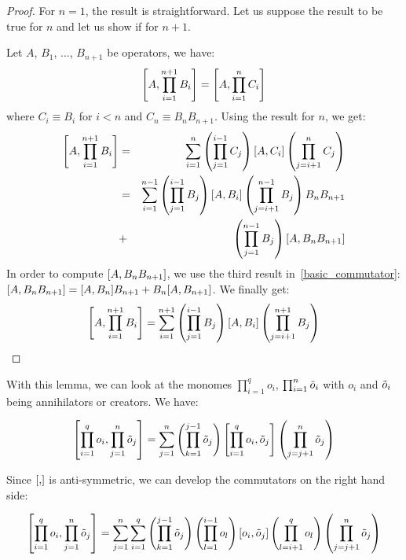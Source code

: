 \begin{proof}
    For $n = 1$, the result is straightforward. Let us suppose the result to be true for $n$ and let us show if for $n+1$.

    Let $A$, $B_1$, ..., $B_{n+1}$ be operators, we have:
    \begin{equation}
        \commutator{A}{\prod_{i = 1}^{n+1} B_i} = \commutator{A}{\prod_{i = 1}^{n} C_i}
    \end{equation}
    where $C_i \equiv B_i$ for $i < n$ and $C_n \equiv B_n B_{n+1}$.
    Using the result for $n$, we get:
    \begin{eqnarray}
        \commutator{A}{\prod_{i = 1}^{n+1} B_i} &=& \sum_{i = 1}^n \left(\prod_{j = 1}^{i-1} C_j \right) \commutator{A}{C_i} \left(\prod_{j = i+1}^{n} C_j \right) \nonumber\\
        &=& \sum_{i = 1}^{n-1} \left(\prod_{j = 1}^{i-1} B_j \right) \commutator{A}{B_i} \left(\prod_{j = i+1}^{n-1} B_j \right) B_n B_{n+1} \nonumber\\
        &+& \left(\prod_{j = 1}^{n-1} B_j \right) \commutator{A}{B_n B_{n+1}}
    \end{eqnarray}
    In order to compute $\commutator{A}{B_n B_{n+1}}$, we use the third result in~\autoref{basic_commutator}: $\commutator{A}{B_n B_{n+1}} = \commutator{A}{B_n} B_{n+1} + B_n \commutator{A}{B_{n+1}}$. We finally get:
    \begin{equation}
        \commutator{A}{\prod_{i = 1}^{n+1} B_i} = \sum_{i = 1}^{n+1} \left(\prod_{j = 1}^{i-1} B_j \right) \commutator{A}{B_i} \left(\prod_{j = i+1}^{n+1} B_j \right)
    \end{equation}
\end{proof}

With this lemma, we can look at the monomes $\prod_{i = 1}^q o_i$, $\prod_{i = 1}^n \Tilde{o}_i$ with $o_i$ and $\Tilde{o}_i$ being annihilators or creators. We have:

\begin{eqnarray}
    \commutator{\prod_{i = 1}^q o_i}{\prod_{j = 1}^n \Tilde{o}_j} = \sum_{j = 1}^n \left(\prod_{k = 1}^{j-1} \Tilde{o}_j \right) \commutator{\prod_{i = 1}^q o_i}{\Tilde{o}_j} \left(\prod_{j = j+1}^{n} \Tilde{o}_j \right)
\end{eqnarray}

Since $\commutator{}{}$ is anti-symmetric, we can develop the commutators on the right hand side:

\begin{eqnarray}
    \commutator{\prod_{i = 1}^q o_i}{\prod_{j = 1}^n \Tilde{o}_j} = \sum_{j = 1}^n \sum_{i = 1}^q \left(\prod_{k = 1}^{j-1} \Tilde{o}_j \right) \left(\prod_{l = 1}^{i-1} o_l\right) \commutator{o_i}{\Tilde{o}_j} \left(\prod_{l = i+1}^{q} o_l\right) \left(\prod_{j = j+1}^{n} \Tilde{o}_j \right)
\end{eqnarray}

